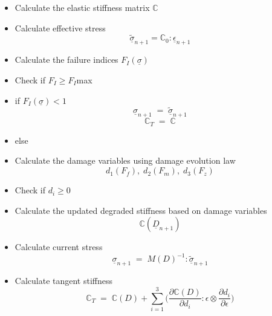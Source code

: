 \documentclass[a4paper,12pt]{extarticle}
\begin{document}
\begin{itemize}
\item Calculate the elastic stiffness matrix  \textbf{$\mathbb{C}$}
\item Calculate effective stress \textbf{$$\underline{\tilde{\sigma}}_{n+1} = \mathbb{C}_{0} : \underline{\epsilon}_{n+1} $$}
\item Calculate the failure indices \textbf{$F_{I}(\underline{\sigma})$}
\item[] Check if $F_{I} \geq F_{I}$max
\item if \textbf{$F_{I}(\underline{\sigma})<1$} \textbf{$$\underline{\sigma}_{n+1} \; = \; \underline{\tilde{\sigma}}_{n+1} $$} \textbf{$$\mathbb{C}_{T} \; = \; \mathbb{C}$$}
\item else
   	
\item[]  Calculate the damage variables using damage evolution law \textbf{$$d_{1}(F_{f}),\;d_{2}(F_{m}),\;d_{3}(F_{z})$$}  	
\item[]  Check if $d_{i} \geq 0 $ 
\item[]  Calculate the updated degraded stiffness based on damage variables \textbf{$$\mathbb{C}(\underline{D}_{n+1})$$}
\item[]  Calculate current stress  \textbf{$$\underline{\sigma}_{n+1} \; = \;  M(D)^{-1}:\underline{\tilde{\sigma}}_{n+1} $$}
\item[] Calculate tangent stiffness \textbf{$$\mathbb{C}_{T}  \; = \;\mathbb{C}(D) + \sum_{i = 1}^{3} \Big( \frac{\partial \mathbb{C}(D) }{\partial d_{i}} : \epsilon \otimes \frac{\partial d_{i}}{\partial \epsilon }\Big)$$}
	
\end{itemize} 
\end{document}
